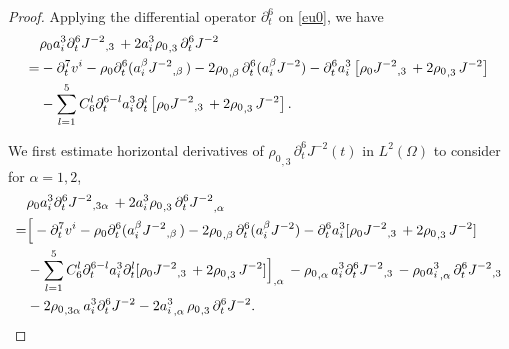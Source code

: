 \documentclass[12pt,twoside,reqno]{amsart}
\numberwithin{equation}{section}
\theoremstyle{definition}
\theoremstyle{remark}
\begin{document}
\begin{proof}
  Applying the differential operator ${\partial}_t^6$  on \eqref{eu0},  we have
\begin{align}\label{eq.vt3}
    &{\rho_0}  a_i^3 {\partial}_t^6{{{J^{-2}}}_{,{3}}\,}+2 a_i^3{{\rho_0}_{,{3}}\,} {\partial}_t^6 J^{-2}{\nonumber}\\
    =&-{\partial}_t^7v^i-{\rho_0}  {\partial}_t^6(a_i^\beta{{{J^{-2}}}_{,{\beta}}\,})-2 {{\rho_0}_{,{\beta}}\,} {\partial}_t^6(a_i^\beta J^{-2})-{\partial}_t^6 a_i^3\left[ {\rho_0}  {{{J^{-2}}}_{,{3}}\,}+2 {{\rho_0}_{,{3}}\,}J^{-2}\right]{\nonumber}\\
    &-\sum_{l=1}^5 C_6^l{\partial}_t^{6-l} a_i^3{\partial}_t^l\left[ {\rho_0}  {{{J^{-2}}}_{,{3}}\,}+2 {{\rho_0}_{,{3}}\,}J^{-2}\right].
\end{align}

We first estimate horizontal derivatives of ${{\rho_0}_{,{3}}\,} {\partial}_t^6 J^{-2}(t)$ in $L^2(\Omega)$ to consider for $\alpha=1,2$,
\begin{align}\label{eq.v3.1}
  &{\rho_0}  a_i^3 {\partial}_t^6{{{J^{-2}}}_{,{3\alpha}}\,}+2 a_i^3{{\rho_0}_{,{3}}\,} {{{{\partial}_t^6 J^{-2}}}_{,{\alpha}}\,}{\nonumber}\\
    =&\Big[-{\partial}_t^7v^i-{\rho_0}  {\partial}_t^6(a_i^\beta{{{J^{-2}}}_{,{\beta}}\,})-2 {{\rho_0}_{,{\beta}}\,} {\partial}_t^6(a_i^\beta J^{-2})-{\partial}_t^6 a_i^3[ {\rho_0}  {{{J^{-2}}}_{,{3}}\,}+2 {{\rho_0}_{,{3}}\,}J^{-2}]{\nonumber}\\
    &-\sum_{l=1}^5 C_6^l{\partial}_t^{6-l} a_i^3{\partial}_t^l[ {\rho_0}  {{{J^{-2}}}_{,{3}}\,}+2 {{\rho_0}_{,{3}}\,}J^{-2}]{{{\Big]}}_{,{\alpha}}\,}-{{\rho_0}_{,{\alpha}}\,}a^3_i{\partial}_t^6{{{J^{-2}}}_{,{3}}\,}-{\rho_0}  {{{a_i^3}}_{,{\alpha}}\,} {\partial}_t^6{{{J^{-2}}}_{,{3}}\,}{\nonumber}\\
    &-2{{\rho_0}_{,{3\alpha}}\,} a_i^3{\partial}_t^6 J^{-2}-2 {{{a_i^3}}_{,{\alpha}}\,}{{\rho_0}_{,{3}}\,}{\partial}_t^6 J^{-2}.
\end{align}


\end{proof}
\end{document}
